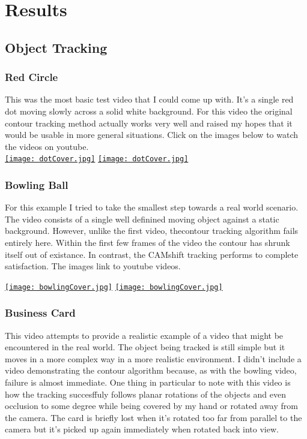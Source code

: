 \documentclass[12pt]{article}
\begin{document}
\section{Results}
\subsection{Object Tracking}
\subsubsection{Red Circle}
This was the most basic test video that I could come up with. It's a single red dot moving slowly across a solid white background. For this video the original contour tracking method actually works very well and raised my hopes that it would be usable in more general situations. Click on the images below to watch the videos on youtube.\\

\href{https://www.youtube.com/watch?v=G7Jh-3KdVLg}{\texttt{[image: dotCover.jpg]}}
\href{https://www.youtube.com/watch?v=RdVge1ayv8o}{\texttt{[image: dotCover.jpg]}}

\subsubsection{Bowling Ball}
For this example I tried to take the smallest step towards a real world scenario. The video consists of a single well definined moving object against a static background. However, unlike the first video, thecontour tracking algorithm fails entirely here. Within the first few frames of the video the contour has shrunk itself out of existance. In contrast, the CAMshift tracking performs to complete satisfaction. The images link to youtube videos.

\href{https://www.youtube.com/watch?v=bA38ntzGErc&feature=youtu.be}{\texttt{[image: bowlingCover.jpg]}}
\href{https://www.youtube.com/watch?v=XLbP9vWncK0}{\texttt{[image: bowlingCover.jpg]}}

\subsubsection{Business Card}
This video attempts to provide a realistic example of a video that might be encountered in the real world. The object being tracked is still simple but it moves in a more complex way in a more realistic environment. I didn't include a video demonstrating the contour algorithm because, as with the bowling video, failure is almost immediate. One thing in particular to note with this video is how the tracking succesffuly follows planar rotations of the objects and even occlusion to some degree while being covered by my hand or rotated away from the camera. The card is briefly lost when it's rotated too far from parallel to the camera but it's picked up again immediately when rotated back into view.
\end{document}
